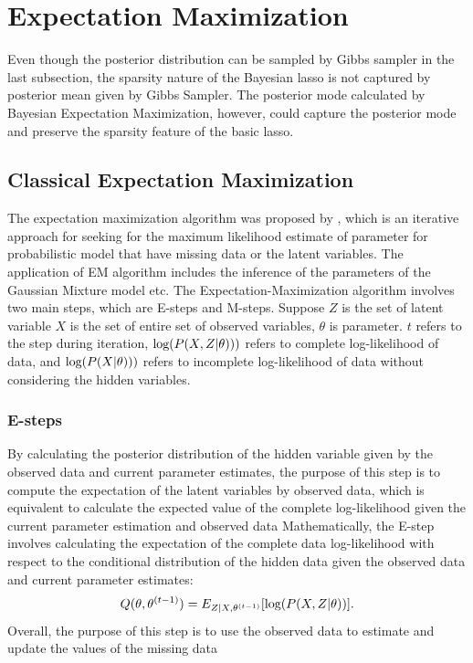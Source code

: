 \section{Expectation Maximization}
Even though the posterior distribution can be sampled by Gibbs sampler in the last subsection, the sparsity nature of the Bayesian lasso is not captured by  posterior mean given by Gibbs Sampler. The posterior mode calculated by Bayesian Expectation Maximization, however, could capture the posterior mode and preserve the sparsity feature of the basic lasso.

\subsection{Classical Expectation Maximization}
The expectation maximization algorithm was proposed by \cite{EM}, which is an iterative approach for seeking for the maximum likelihood estimate of parameter for probabilistic model that have missing data or the latent variables.
The application of EM algorithm includes the inference of the parameters of the Gaussian Mixture model etc. The Expectation-Maximization algorithm involves two main steps, which are E-steps and M-steps.
Suppose $Z$ is the set of latent variable $X$ is the set of entire set of observed variables, $\theta$ is parameter. $t$ refers to the step during iteration, $\textnormal{log}(P(X,Z|\theta)))$ refers to complete log-likelihood of data, and $\textnormal{log}(P(X|\theta)))$ refers to incomplete log-likelihood of data without considering the hidden variables.
\subsubsection{E-steps}
By calculating the posterior distribution of the hidden variable given by the observed data and current parameter estimates, the purpose of this step is to compute the expectation of the latent variables by observed data, which is equivalent to calculate the expected value of the complete log-likelihood given the current parameter estimation and observed data
Mathematically, the E-step involves calculating the expectation of the complete data log-likelihood with respect to the conditional distribution of the hidden data given the observed data and current parameter estimates:
\begin{equation}
	Q(\theta,\theta^{(t-1)}) = E_{Z|X,\theta^{(t-1)}}[\textnormal{log}(P(X,Z|\theta))].
\end{equation}
Overall, the purpose of this step is to use the observed data to estimate and update the values of the missing data

